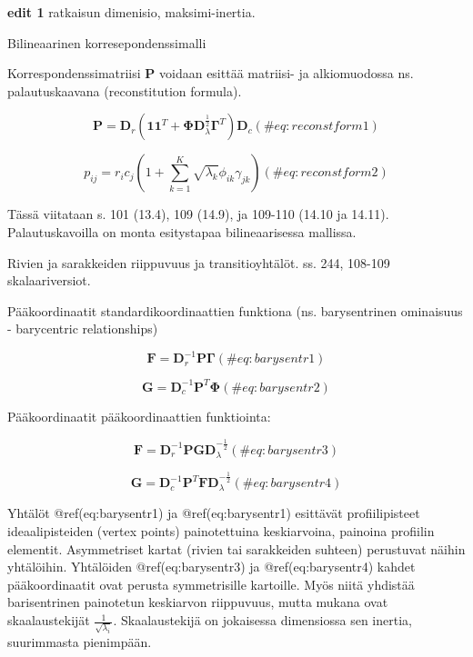 \documentclass[
  finnish,
]{book}
\begin{document}
\textbf{edit 1} ratkaisun dimenisio, maksimi-inertia.

Bilineaarinen korresepondenssimalli

Korrespondenssimatriisi \(\boldsymbol{P}\) voidaan esittää matriisi- ja
alkiomuodossa ns. palautuskaavana (reconstitution formula).

\begin{equation}
\boldsymbol{P} = \boldsymbol{D}_{r} \left( \boldsymbol{1}\boldsymbol{1}^{T} + \boldsymbol{\Phi}\boldsymbol{D}_{\lambda}^{\frac {1}{2}}\boldsymbol{\Gamma}^{T}\right)\boldsymbol{D}_{c}
(\#eq:reconstform1)
\end{equation}

\begin{equation}
p_ {ij}= r_{i}c_{j} \left(1 + \sum_{k=1}^{K} \sqrt{\lambda_{k}} \phi_{ik} \gamma_{jk} \right)
(\#eq:reconstform2)
\end{equation}

Tässä viitataan s. 101 (13.4), 109 (14.9), ja 109-110 (14.10 ja 14.11).
Palautuskavoilla on monta esitystapaa bilineaarisessa mallissa.

Rivien ja sarakkeiden riippuvuus ja transitioyhtälöt. ss. 244, 108-109
skalaariversiot.

Pääkoordinaatit standardikoordinaattien funktiona (ns. barysentrinen
ominaisuus - barycentric relationships)

\begin{equation}
\boldsymbol{F} = \boldsymbol{D}_{r}^{-1} \boldsymbol{P}\boldsymbol{\Gamma}
(\#eq:barysentr1)
\end{equation}

\begin{equation}
\boldsymbol{G} = \boldsymbol{D}_{c}^{-1} \boldsymbol{P}^{T}\boldsymbol{\Phi}
(\#eq:barysentr2)
\end{equation}

Pääkoordinaatit pääkoordinaattien funktiointa:

\begin{equation}
\boldsymbol{F} = \boldsymbol{D}_{r}^{-1} \boldsymbol{P}\boldsymbol{G}\boldsymbol{D}_{\lambda}^{-\frac{1}{2}}
(\#eq:barysentr3)
\end{equation}

\begin{equation}
\boldsymbol{G} = \boldsymbol{D}_{c}^{-1} \boldsymbol{P}^{T}\boldsymbol{F}\boldsymbol{D}_{\lambda}^{-\frac{1}{2}}
(\#eq:barysentr4)
\end{equation}

Yhtälöt @ref(eq:barysentr1) ja @ref(eq:barysentr1) esittävät
profiilipisteet ideaalipisteiden (vertex points) painotettuina
keskiarvoina, painoina profiilin elementit. Asymmetriset kartat (rivien
tai sarakkeiden suhteen) perustuvat näihin yhtälöihin. Yhtälöiden
@ref(eq:barysentr3) ja @ref(eq:barysentr4) kahdet pääkoordinaatit ovat
perusta symmetrisille kartoille. Myös niitä yhdistää barisentrinen
painotetun keskiarvon riippuvuus, mutta mukana ovat skaalaustekijät
\(\frac{1}{\sqrt{\lambda_{i}}}\). Skaalaustekijä on jokaisessa
dimensiossa sen inertia, suurimmasta pienimpään.
\end{document}
